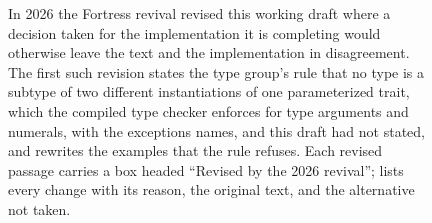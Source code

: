 \begin{figure}[p]


In 2026 the Fortress revival revised this working draft where a decision
taken for the implementation it is completing would otherwise leave the
text and the implementation in disagreement.
The first such revision states the type group's rule that no type is a
subtype of two different instantiations of one parameterized trait, which
the compiled type checker enforces for type arguments and numerals, with the exceptions  names, and this draft had
not stated, and
rewrites the examples that the rule refuses.
Each revised passage carries a box headed ``Revised by the 2026 revival'';
 lists every change with its reason, the original
text, and the alternative not taken.
\end{figure}


